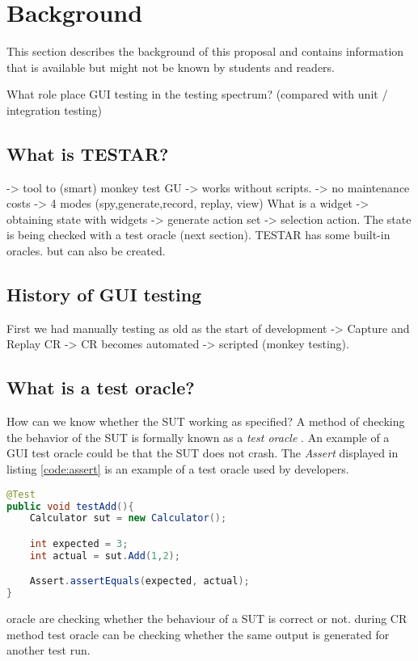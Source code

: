 \section{Background} \label{background}
This section describes the background of this proposal and contains information that is available but might not be known by students and readers.

What role place GUI testing in the testing spectrum? (compared with unit / integration testing)

\subsection{What is TESTAR?}
-> tool to (smart) monkey test GU -> works without scripts. -> no maintenance costs -> 4 modes (spy,generate,record, replay, view)
What is a widget -> obtaining state with widgets -> generate action set -> selection action.
The state is being checked with a test oracle (next section). TESTAR has some built-in oracles. but can also be created.

\subsection{History of GUI testing}
First we had manually testing as old as the start of development -> Capture and Replay CR -> CR becomes automated -> scripted (monkey testing).

\subsection{What is a test oracle?}
How can we know whether the SUT working as specified? A method of checking the behavior of the SUT is formally known as a \textit{test oracle} \cite{testOracles}. An example of a GUI test oracle could be that the SUT does not crash. The \textit{Assert} displayed in listing \ref{code:assert} is an example of a test oracle used by developers.

\begin{lstlisting}[language=Java, caption=Assertion, label=code:assert]
@Test
public void testAdd(){
    Calculator sut = new Calculator();

    int expected = 3;
    int actual = sut.Add(1,2);

    Assert.assertEquals(expected, actual);
}
\end{lstlisting}

oracle are checking whether the behaviour of a SUT is correct or not\cite{testOracles}. during CR method test oracle can be checking whether the same output is generated for another test run. 

